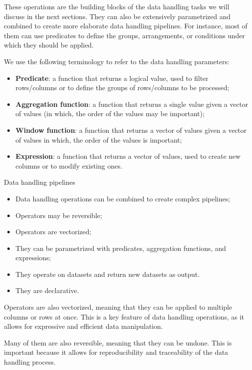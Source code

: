 These operations are the building blocks of the data handling tasks we will discuss in the
next sections.  They can also be extensively parametrized and combined to create more
elaborate data handling pipelines.  For instance, most of them can use predicates to
define the groups, arrangements, or conditions under which they should be applied.

We use the following terminology to refer to the data handling parameters:
\begin{itemize}
  \item \textbf{Predicate}: a function that returns a logical value, used to filter
    rows/columns or to define the groups of rows/columns to be processed;
  \item \textbf{Aggregation function}: a function that returns a single value given a vector
    of values (in which, the order of the values may be important);
  \item \textbf{Window function}: a function that returns a vector of values given a vector
    of values in which, the order of the values is important;
  \item \textbf{Expression}: a function that returns a vector of values, used to create new
    columns or to modify existing ones.
\end{itemize}

\begin{slidebox}{Data handling pipelines}{}
  \begin{itemize}
    \item Data handling operations can be combined to create complex pipelines;
    \item Operators may be reversible;
    \item Operators are vectorized;
    \item They can be parametrized with predicates, aggregation functions, and expressions;
    \item They operate on datasets and return new datasets as output.
    \item They are declarative.
  \end{itemize}
\end{slidebox}

Operators are also vectorized, meaning that they can be applied to multiple columns or
rows at once.  This is a key feature of data handling operations, as it allows for
expressive and efficient data manipulation.

Many of them are also reversible, meaning that they can be undone.  This is important
because it allows for reproducibility and traceability of the data handling process.

